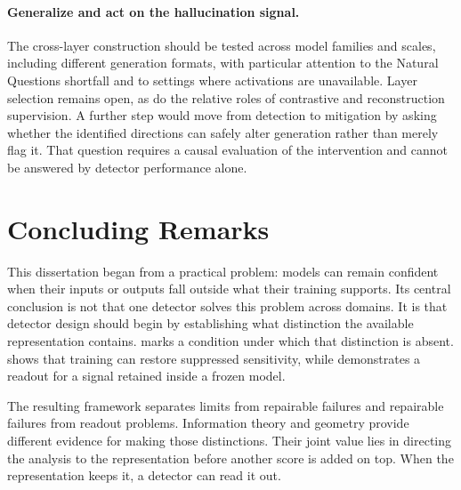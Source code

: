 \paragraph{Generalize and act on the hallucination signal.}
The cross-layer construction should be tested across model families and scales,
including different generation formats, with particular attention to the Natural
Questions shortfall and to settings where activations are unavailable. Layer
selection remains open, as do the relative roles of contrastive and reconstruction
supervision. A further
step would move from detection to mitigation by asking whether the identified
directions can safely alter generation rather than merely flag it. That question
requires a causal evaluation of the intervention and cannot be answered by detector
performance alone.

\section{Concluding Remarks}
\label{sec:concl:remarks}

This dissertation began from a practical problem: models can remain confident when
their inputs or outputs fall outside what their training supports. Its central
conclusion is not that one detector solves this problem across domains. It is that
detector design should begin by establishing what distinction the available
representation contains.  marks a condition under which
that distinction is absent.  shows that
training can restore suppressed sensitivity, while
 demonstrates a readout for a signal retained
inside a frozen model.

The resulting framework separates limits from repairable failures and repairable
failures from readout problems. Information theory and geometry provide different
evidence for making those distinctions. Their joint value lies in directing the
analysis to the representation before another score is added on top.
When the representation keeps it, a detector can read it out.
